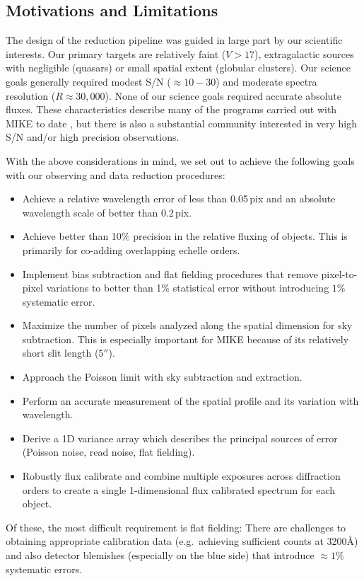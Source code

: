 \documentclass[12pt,preprint]{aastex}
\begin{document}
\subsection{Motivations and Limitations}

The design of the reduction pipeline was guided in large
part by our scientific interests.  Our primary targets are
relatively faint ($V>17$), extragalactic sources with negligible
(quasars) or small spatial extent (globular clusters).
Our science goals generally required modest S/N ($\approx 10-30$)
and moderate spectra resolution ($R\approx 30,000$). 
None of our science goals required accurate absolute fluxes.
These characteristics describe many of the programs carried
out with MIKE to date \citep[e.g.][]{cpb+05,mlk+07,dab+07,fpl+08},
but there is also a substantial community interested in very
high S/N and/or high precision observations.

With the above considerations in mind, we set out to achieve
the following goals with our observing and data reduction
procedures:

\begin{itemize}

\item  Achieve a relative wavelength error of less than 0.05\,pix
and an absolute wavelength scale of better than 0.2\,pix.

\item  Achieve better than 10$\%$ precision in the relative fluxing
of objects.  This is primarily  for co-adding 
overlapping echelle orders.

\item  Implement bias subtraction and flat fielding procedures
that remove pixel-to-pixel variations to better than 1$\%$ statistical
error without introducing $1\%$ systematic error.

\item  Maximize the number of pixels analyzed along the spatial 
dimension for sky subtraction.  This is especially important for MIKE
because of its relatively short slit length ($5''$).

\item  Approach the Poisson limit with sky subtraction and extraction.

\item  Perform an accurate measurement of the spatial profile and
its variation with wavelength.

\item  Derive a 1D variance array which describes the principal sources
of error (Poisson noise, read noise, flat fielding).

\item  Robustly flux calibrate and combine multiple exposures across
diffraction orders to create a single 1-dimensional flux calibrated 
spectrum for each object.

\end{itemize}
Of these, the most difficult requirement is flat fielding:
There are challenges to obtaining appropriate calibration data 
(e.g.\ achieving sufficient counts at 3200\AA) and also
detector blemishes (especially on the blue side) 
that introduce $\approx 1\%$ systematic errors.
\end{document}
